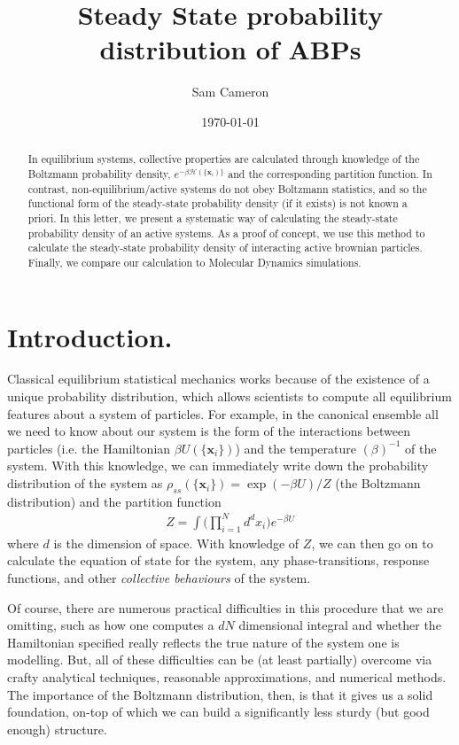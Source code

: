 \documentclass[twocolumn,amsmath,amssymb,aps]{revtex4-1}%
\begin{document}
 
\title{Steady State probability distribution of ABPs}
\author{Sam Cameron}
%
\date{\today}

\begin{abstract}
  In equilibrium systems, collective properties are calculated
  through knowledge of the Boltzmann probability density,
  $e^{-\beta \mathcal{H}(\{\bm{x}_i)\}}$ and the corresponding partition
  function. In contrast, non-equilibrium/active systems do not obey
  Boltzmann statistics, and so the functional form of the steady-state
  probability density (if it exists) is not known a priori. In this letter,
  we present a systematic way of calculating the steady-state
  probability density of an active systems. As a proof of concept, we use
  this method to calculate the steady-state probability density of
  interacting active brownian particles. Finally, we compare our calculation
  to Molecular Dynamics simulations.
\end{abstract}


\maketitle


\section{Introduction.}
Classical equilibrium statistical mechanics works because of the existence of
a unique probability distribution, which allows scientists to compute
all equilibrium features about a system of particles. For example,
in the canonical ensemble all we need to know about our system is the
form of the interactions between particles (i.e. the Hamiltonian
$\beta U(\{\bm{x}_i\})$) and the temperature $(\beta)^{-1}$ of
the system. With this knowledge, we can immediately write down the probability
distribution of the system as $\rho_{ss}(\{\bm{x}_i\})=\exp(-\beta U)/Z$
(the Boltzmann distribution) and the partition function
\begin{align}
  Z = \int \bigg(\prod_{i=1}^Nd^dx_i\bigg)e^{-\beta U}
\end{align}
where $d$ is the dimension of space. With knowledge of $Z$, we can then
go on to calculate the equation of state for the system, any phase-transitions,
response functions, and other \textit{collective behaviours} of the
system.

Of course, there are numerous practical difficulties in this procedure that
we are omitting, such as how one computes a $dN$ dimensional integral
and whether the Hamiltonian specified really reflects the true nature of
the system one is modelling. But, all of these difficulties can be (at least
partially) overcome via crafty analytical techniques, reasonable
approximations, and numerical methods. The importance of the Boltzmann
distribution, then, is that it gives us a solid foundation, on-top of which we
can build a significantly less sturdy (but good enough) structure.
\end{document}
